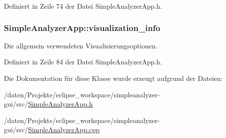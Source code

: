Definiert in Zeile 74 der Datei Simple\-Analyzer\-App.\-h.

\hypertarget{classSimpleAnalyzerApp_a6cfd36a56cc92ee6cd25512744c6adda}{
\subsubsection[{visualization\-\_\-info}]{ Simple\-Analyzer\-App\-::visualization\-\_\-info\hspace{0.3cm}{\ttfamily [private]}}}\label{classSimpleAnalyzerApp_a6cfd36a56cc92ee6cd25512744c6adda}


Die allgemein verwendeten Visualisierungsoptionen. 



Definiert in Zeile 84 der Datei Simple\-Analyzer\-App.\-h.



Die Dokumentation für diese Klasse wurde erzeugt aufgrund der Dateien\-:\begin{DoxyCompactItemize}
\item 
/daten/\-Projekte/eclipse\-\_\-workspace/simpleanalyzer-\/gui/src/\hyperlink{SimpleAnalyzerApp_8h}{Simple\-Analyzer\-App.\-h}\item 
/daten/\-Projekte/eclipse\-\_\-workspace/simpleanalyzer-\/gui/src/\hyperlink{SimpleAnalyzerApp_8cpp}{Simple\-Analyzer\-App.\-cpp}\end{DoxyCompactItemize}
